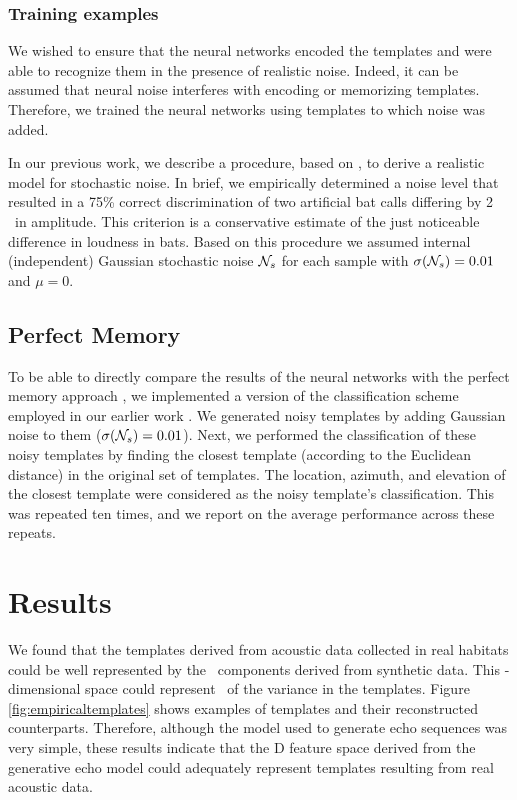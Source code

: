 \documentclass[preprint,5p]{elsarticle}
\begin{document}
\subsubsection{Training examples}

We wished to ensure that the neural networks encoded the templates and were able to recognize them in the presence of realistic noise. Indeed, it can be assumed that neural noise interferes with encoding or memorizing templates. Therefore, we trained the neural networks using templates to which noise was added.

In our previous work, we describe a procedure, based on \citet{Dau1996}, to derive a realistic model for stochastic noise. In brief, we empirically determined a noise level that resulted in a 75\% correct discrimination of two artificial bat calls differing by 2 \db\ in amplitude. This criterion is a conservative estimate of the just noticeable difference in loudness in bats. Based on this procedure we assumed internal (independent) Gaussian stochastic noise $\mathcal{N}_s$ for each sample with $\sigma(\mathcal{N}_s) = 0.01$ and $\mu=0$.

\subsection{Perfect Memory}

To be able to directly compare the results of the neural networks with the perfect memory approach \citep{Baddeley2012}, we implemented a version of the classification scheme employed in our earlier work \citep{Vanderelst2016}. We generated noisy templates by adding Gaussian noise to them ($\sigma(\mathcal{N}_s) = 0.01$). Next, we performed the classification of these noisy templates by finding the closest template (according to the Euclidean distance) in the original set of templates. The location, azimuth, and elevation of the closest template were considered as the noisy template's classification. This was repeated ten times, and we report on the average performance across these repeats.

\section{Results}

We found that the templates derived from acoustic data collected in real habitats could be well represented by the \pca\ components derived from synthetic data. This \pca-dimensional space could represent \pcaExplainedVar\ of the variance in the templates. Figure \ref{fig:empiricaltemplates} shows examples of templates and their reconstructed counterparts. Therefore, although the model used to generate echo sequences was very simple, these results indicate that the \pca D feature space derived from the generative echo model could adequately represent templates resulting from real acoustic data.
\end{document}
